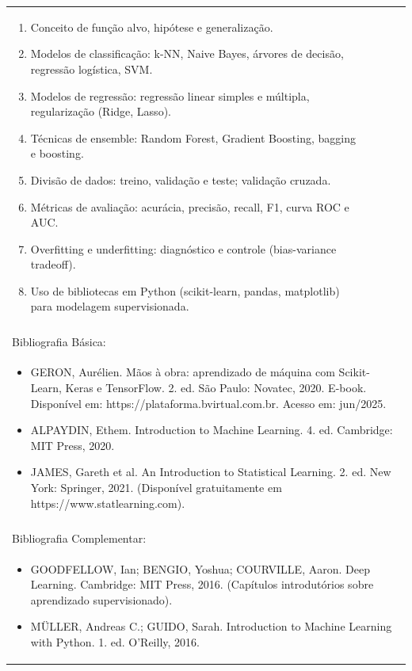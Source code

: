 \documentclass[11pt]{article}
\begin{document}
\begin{center}
\begin{longtable}{|p{4cm}|p{4cm}|p{4cm}|p{4cm}|}
{\begin{enumerate}
\item Conceito de função alvo, hipótese e generalização.
\item Modelos de classificação: k-NN, Naive Bayes, árvores de decisão, regressão logística, SVM.
\item Modelos de regressão: regressão linear simples e múltipla, regularização (Ridge, Lasso).
\item Técnicas de ensemble: Random Forest, Gradient Boosting, bagging e boosting.
\item Divisão de dados: treino, validação e teste; validação cruzada.
\item Métricas de avaliação: acurácia, precisão, recall, F1, curva ROC e AUC.
\item Overfitting e underfitting: diagnóstico e controle (bias-variance tradeoff).
\item Uso de bibliotecas em Python (scikit-learn, pandas, matplotlib) para modelagem supervisionada.\end{enumerate}}\\
\multicolumn{4}{|p{16cm}|}{}\\
\hline
\multicolumn{4}{|p{16cm}|}{Bibliografia Básica:}\\
\multicolumn{4}{|p{16cm}|}{%
\begin{itemize}\item GERON, Aurélien. Mãos à obra: aprendizado de máquina com Scikit-Learn, Keras e TensorFlow. 2. ed. São Paulo: Novatec, 2020. E-book. Disponível em: https://plataforma.bvirtual.com.br. Acesso em: jun/2025.
\item ALPAYDIN, Ethem. Introduction to Machine Learning. 4. ed. Cambridge: MIT Press, 2020.
\item JAMES, Gareth et al. An Introduction to Statistical Learning. 2. ed. New York: Springer, 2021. (Disponível gratuitamente em https://www.statlearning.com).\end{itemize}}\\
\multicolumn{4}{|p{16cm}|}{}\\
\hline
\multicolumn{4}{|p{16cm}|}{Bibliografia Complementar:}\\
\multicolumn{4}{|p{16cm}|}{%
\begin{itemize}\item GOODFELLOW, Ian; BENGIO, Yoshua; COURVILLE, Aaron. Deep Learning. Cambridge: MIT Press, 2016. (Capítulos introdutórios sobre aprendizado supervisionado).
\item MÜLLER, Andreas C.; GUIDO, Sarah. Introduction to Machine Learning with Python. 1. ed. O'Reilly, 2016.

\end{itemize}}
\end{longtable}
\end{center}
\end{document}
